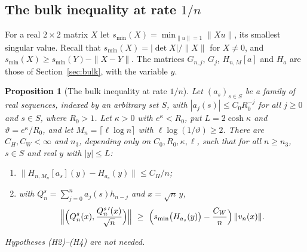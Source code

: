 \documentclass[11pt]{amsart}
\newtheorem{proposition}[theorem]{Proposition}
\theoremstyle{definition}
\theoremstyle{remark}
\numberwithin{equation}{section}
\begin{document}
\subsection{The bulk inequality at rate \texorpdfstring{$1/n$}{1/n}}\label{subsec:collision-rate}
For a real $2\times2$ matrix $X$ let $s_{\min}(X)=\min_{\|u\|=1}\|Xu\|$, its smallest singular value. Recall that $s_{\min}(X)=|\det X|/\|X\|$ for $X\ne0$, and $s_{\min}(X)\ge s_{\min}(Y)-\|X-Y\|$. The matrices $G_{n,j}$, $G_j$, $H_{n,M}[a]$ and $H_a$ are those of Section~\ref{sec:bulk}, with the variable $y$.

\begin{proposition}[The bulk inequality at rate $1/n$]\label{prop:bulkrate}
Let $(a_s)_{s\in S}$ be a family of real sequences, indexed by an arbitrary set $S$, with $|a_j(s)|\le C_0R_0^{-j}$ for all $j\ge0$ and $s\in S$, where $R_0>1$. Let $\kappa>0$ with $e^\kappa<R_0$, put $L=2\cosh\kappa$ and $\vartheta=e^\kappa/R_0$, and let $M_n=\lceil\ell\log n\rceil$ with $\ell\log(1/\vartheta)\ge2$. There are $C_H,C_W<\infty$ and $n_3$, depending only on $C_0,R_0,\kappa,\ell$, such that for all $n\ge n_3$, $s\in S$ and real $y$ with $|y|\le L$:
\begin{enumerate}
\item[(a)] $\|H_{n,M_n}[a_s](y)-H_{a_s}(y)\|\le C_H/n$;
\item[(b)] with $Q_n^s=\sum_{j=0}^na_j(s)h_{n-j}$ and $x=\sqrt n\,y$,
\[
\Bigl\|\Bigl(Q_n^s(x),\frac{Q_n^s{}'(x)}{\sqrt n}\Bigr)\Bigr\|\ \ge\ \Bigl(s_{\min}\bigl(H_{a_s}(y)\bigr)-\frac{C_W}n\Bigr)\,\|v_n(x)\| .
\]
\end{enumerate}
Hypotheses (H2)--(H4) are not needed.
\end{proposition}
\end{document}
